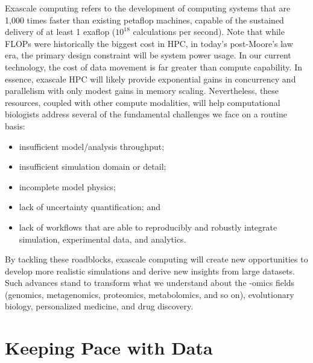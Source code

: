 \par Exascale computing refers to the development of computing systems that are 1,000 times faster than existing petaflop machines, capable of the sustained delivery of at least 1 exaflop ($10^{18}$ calculations per second). Note that while FLOPs were historically the biggest cost in HPC, in today's post-Moore's law era, the primary design constraint will be system power usage. In our current technology, the cost of data movement is far greater than compute capability. In essence, exascale HPC will likely provide exponential gains in concurrency and parallelism with only modest gains in memory scaling. Nevertheless, these resources, coupled with other compute modalities, will help computational biologists address several of the fundamental challenges we face on a routine basis:
\begin{itemize}
  \item insufficient model/analysis throughput;
  \item insufficient simulation domain or detail;
  \item incomplete model physics;
  \item lack of uncertainty quantification; and
  \item lack of workflows that are able to reproducibly and robustly integrate simulation, experimental data, and analytics.
\end{itemize}
\par By tackling these roadblocks, exascale computing will create new opportunities to develop more realistic simulations and derive new insights from large datasets. Such advances stand to transform what we understand about the -omics fields (genomics, metagenomics, proteomics, metabolomics, and so on), evolutionary biology, personalized medicine, and drug discovery.


\section{Keeping Pace with Data}

